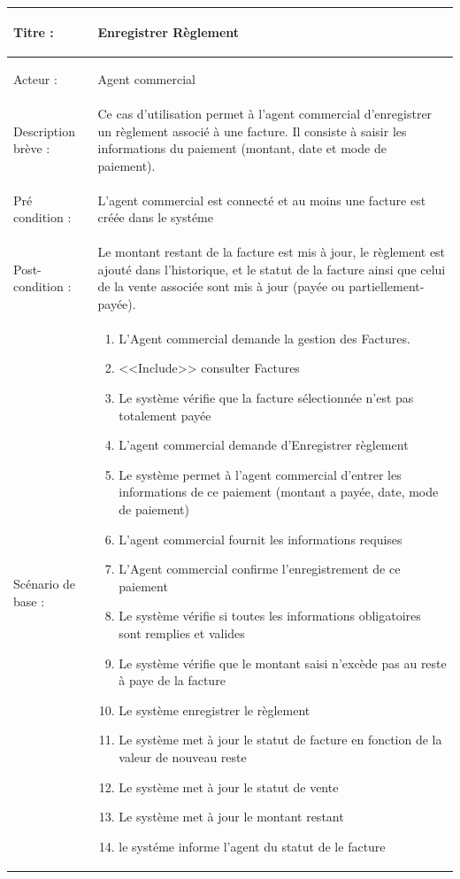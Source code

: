 \begin{longtable}{|>{\bfseries\raggedright\arraybackslash}p{3.5cm}|p{\dimexpr\textwidth-3.5cm-4\tabcolsep-2\arrayrulewidth}|}
\hline
Titre : & Enregistrer Règlement \\
\hline
Acteur : & Agent commercial \\
\hline
Description brève : & Ce cas d'utilisation permet à l'agent commercial d'enregistrer un règlement associé à une facture. Il consiste à saisir les informations du paiement (montant, date et mode de paiement). \\
\hline
Pré condition : & L'agent commercial est connecté et au moins une facture est créée dans le systéme \\
\hline
Post-condition : & Le montant restant de la facture est mis à jour, le règlement est ajouté dans l'historique, et le statut de la facture ainsi que celui de la vente associée sont mis à jour (payée ou partiellement-payée). \\
\hline
Scénario de base : &
\begin{enumerate}[leftmargin=1.5em, topsep=2pt, itemsep=1pt]
  \item L'Agent commercial demande la gestion des Factures.
  \item <<Include>> consulter Factures
  \item Le système vérifie que la facture sélectionnée n'est pas totalement payée
  \item L'agent commercial demande d'Enregistrer règlement
  \item Le système permet à l'agent commercial d'entrer les informations de ce paiement (montant a payée, date, mode de paiement)
  \item L'agent commercial fournit les informations requises
  \item L'Agent commercial confirme l'enregistrement de ce paiement
  \item Le système vérifie si toutes les informations obligatoires sont remplies et valides
  \item Le système vérifie que le montant saisi n'excède pas au reste à paye de la facture
  \item Le système enregistrer le règlement
  \item Le système met à jour le statut de facture en fonction de la valeur de nouveau reste
  \item Le système met à jour le statut de vente
  \item Le système met à jour le montant restant
  \item le systéme informe l'agent du statut de le facture

\end{enumerate}
\end{longtable}
